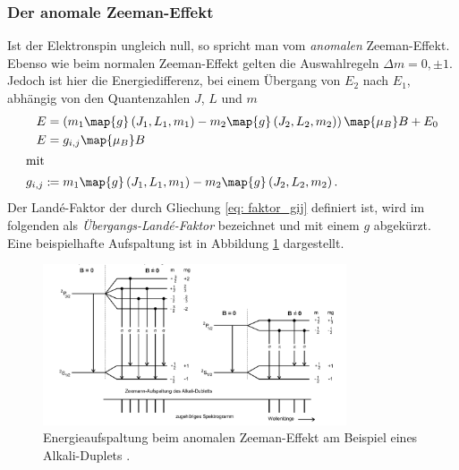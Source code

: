 \subsubsection{Der anomale Zeeman-Effekt}
Ist der Elektronspin ungleich null, so spricht man vom \emph{anomalen} Zeeman-Effekt.
Ebenso wie beim normalen Zeeman-Effekt gelten die Auswahlregeln $\Delta m=0, \pm 1$.
Jedoch ist hier die Energiedifferenz, bei einem Übergang von $E_2$ nach $E_1$,
abhängig von den Quantenzahlen $J$, $L$ und $m$
\begin{align}
  E&=\left(m_1\map{g}\left(J_1,L_1,m_1\right)-m_2\map{g}\left(J_2,L_2,m_2\right)\right)\map{\mu_B}B+E_0 \notag \\
  E&=g_{i,j}\map{\mu_B}B \label{eq:energie_anomale_zemman}\\
\shortintertext{mit}
g_{i,j}:\!\!&=m_1\map{g}\left(J_1,L_1,m_1\right)-m_2\map{g}\left(J_2,L_2,m_2\right)\label{eq: faktor_gij}.
\end{align}
Der Landé-Faktor der durch Gliechung \eqref{eq: faktor_gij} definiert ist, wird im folgenden als \emph{Übergangs-Landé-Faktor} bezeichnet
und mit einem $g$ abgekürzt.
Eine beispielhafte Aufspaltung ist in Abbildung \ref{fig: energie_aufspaltung_annomaler} dargestellt.
\FloatBarrier
\begin{figure}[h]
  \centering
  \includegraphics[width=0.8\textwidth]{pics/energieaufspaltung_annomaler.png}
  \caption{Energieaufspaltung beim anomalen Zeeman-Effekt am Beispiel eines Alkali-Duplets \cite{anleitung27}.}
  \label{fig: energie_aufspaltung_annomaler}
\end{figure}
\FloatBarrier
